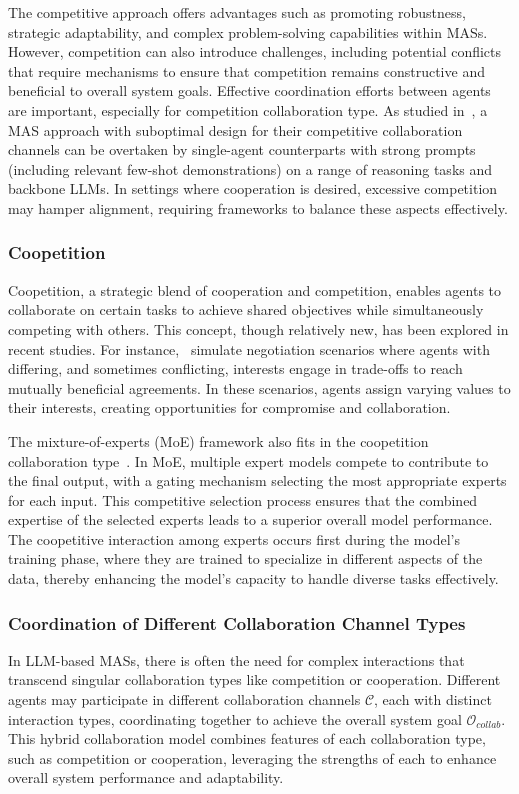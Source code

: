 \documentclass[acmsmall,nonacm]{acmart}
\begin{document}
            The competitive approach offers advantages such as promoting robustness, strategic adaptability, and complex problem-solving capabilities within MASs. However, competition can also introduce challenges, including potential conflicts that require mechanisms to ensure that competition remains constructive and beneficial to overall system goals. Effective coordination efforts between agents are important, especially for competition collaboration type. As studied in~\cite{wang-etal-2024-rethinking-bounds}, a MAS approach with suboptimal design for their competitive collaboration channels can be overtaken by single-agent counterparts with strong prompts (including relevant few-shot demonstrations) on a range of reasoning tasks and backbone LLMs. In settings where cooperation is desired, excessive competition may hamper alignment, requiring frameworks to balance these aspects effectively.

        \subsubsection{Coopetition}
            Coopetition, a strategic blend of cooperation and competition, enables agents to collaborate on certain tasks to achieve shared objectives while simultaneously competing with others. This concept, though relatively new, has been explored in recent studies. For instance,~\cite{abdelnabi2024cooperation,davidson2024evaluating} simulate negotiation scenarios where agents with differing, and sometimes conflicting, interests engage in trade-offs to reach mutually beneficial agreements. In these scenarios, agents assign varying values to their interests, creating opportunities for compromise and collaboration.

            The mixture-of-experts (MoE) framework also fits in the coopetition collaboration type~\cite{cai2024surveymixtureexperts,ahn2021nested}. In MoE, multiple expert models compete to contribute to the final output, with a gating mechanism selecting the most appropriate experts for each input. This competitive selection process ensures that the combined expertise of the selected experts leads to a superior overall model performance. The coopetitive interaction among experts occurs first during the model's training phase, where they are trained to specialize in different aspects of the data, thereby enhancing the model's capacity to handle diverse tasks effectively.

        \subsubsection{Coordination of Different Collaboration Channel Types}
            In LLM-based MASs, there is often the need for complex interactions that transcend singular collaboration types like competition or cooperation. Different agents may participate in different collaboration channels $\mathcal{C}$, each with distinct interaction types, coordinating together to achieve the overall system goal $\mathcal{O}_{collab}$. This hybrid collaboration model combines features of each collaboration type, such as competition or cooperation, leveraging the strengths of each to enhance overall system performance and adaptability.
\end{document}
